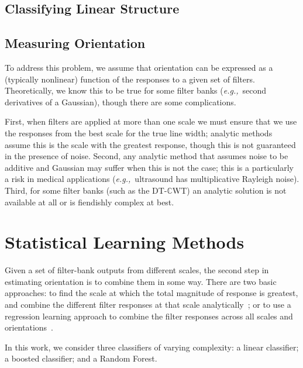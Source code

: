 \documentclass{IEEEtran}
\def\eg{\emph{e.g.,}}
\def\dtcwt{DT-$\mathbb{C}$WT}
\begin{document}
\subsection{Classifying Linear Structure}
%
%
%

\subsection{Measuring Orientation}
\label{s:measuring_orientation}
%
To address this problem, we assume that orientation can be expressed as a (typically nonlinear) function of the responses to a given set of filters. Theoretically, we know this to be true for some filter banks (\eg~second derivatives of a Gaussian), though there are some complications. 

First, when filters are applied at more than one scale we must ensure that we use the responses from the best scale for the true line width; analytic methods~\cite{Karssemeijer_teBrake_TMI96,Mei_etal_IVC09} assume this is the scale with the greatest response, though this is not guaranteed in the presence of noise. Second, any analytic method that assumes noise to be additive and Gaussian may suffer when this is not the case; this is a particularly a risk in medical applications (\eg~ultrasound has multiplicative Rayleigh noise). Third, for some filter banks (such as the \dtcwt{}) an analytic solution is not available at all or is fiendishly complex at best.




\clearpage
\section{Statistical Learning Methods}
Given a set of filter-bank outputs from different scales, the second step in estimating orientation is to combine them in some way. There are two basic approaches: to find the scale at which the total magnitude of response is greatest, and combine the different filter responses at that scale analytically~\cite{Karssemeijer_teBrake_TMI96,Mei_etal_IVC09}; or to use a regression learning approach to combine the filter responses across all scales and orientations~\cite{Berks_etal_IPMI11}.

In this work, we consider three classifiers of varying complexity: a linear classifier; a boosted classifier; and a Random Forest.
\end{document}
